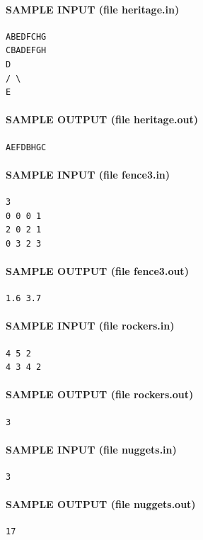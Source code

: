 \documentclass[11pt]{article}
\begin{document}
\paragraph{SAMPLE INPUT (file heritage.in)}
\begin{verbatim}
ABEDFCHG
CBADEFGH
D
/ \
E
\end{verbatim}

\paragraph{SAMPLE OUTPUT (file heritage.out)}
\begin{verbatim}
AEFDBHGC
\end{verbatim}

\paragraph{SAMPLE INPUT (file fence3.in)}
\begin{verbatim}
3
0 0 0 1
2 0 2 1
0 3 2 3
\end{verbatim}

\paragraph{SAMPLE OUTPUT (file fence3.out)}
\begin{verbatim}
1.6 3.7
\end{verbatim}

\paragraph{SAMPLE INPUT (file rockers.in)}
\begin{verbatim}
4 5 2
4 3 4 2
\end{verbatim}

\paragraph{SAMPLE OUTPUT (file rockers.out)}
\begin{verbatim}
3
\end{verbatim}

\paragraph{SAMPLE INPUT (file nuggets.in)}
\begin{verbatim}
3
\end{verbatim}

\paragraph{SAMPLE OUTPUT (file nuggets.out)}
\begin{verbatim}
17
\end{verbatim}
\end{document}
